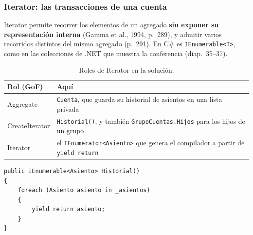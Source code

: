 \subsubsection{Iterator: las transacciones de una cuenta}

Iterator permite recorrer los elementos de un agregado \textbf{sin exponer su representación
interna} (Gamma et al., 1994, p.~289), y admitir varios recorridos distintos del mismo
agregado (p.~291). En C\# es \texttt{IEnumerable<T>}, como en las colecciones de .NET que
muestra la conferencia (diap.~35--37).

\begin{table}[H]
\centering
\small
\begin{tabularx}{\textwidth}{>{\raggedright\arraybackslash}p{2.6cm} >{\raggedright\arraybackslash}X}
\toprule
\textbf{Rol (GoF)} & \textbf{Aquí} \\
\midrule
Aggregate & \texttt{Cuenta}, que guarda su historial de asientos en una lista privada \\
CreateIterator & \texttt{Historial()}, y también \texttt{GrupoCuentas.Hijos} para los hijos de
                 un grupo \\
Iterator & el \texttt{IEnumerator<Asiento>} que genera el compilador a partir de
           \texttt{yield return} \\
\bottomrule
\end{tabularx}
\caption{Roles de Iterator en la solución.}
\end{table}

\begin{lstlisting}[basicstyle=\ttfamily\footnotesize, columns=fullflexible, keepspaces=true]
public IEnumerable<Asiento> Historial()
{
    foreach (Asiento asiento in _asientos)
    {
        yield return asiento;
    }
}
\end{lstlisting}

